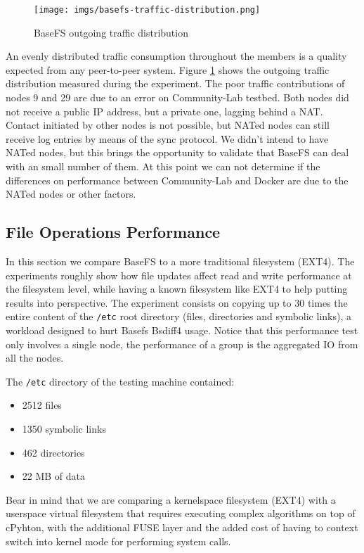 \documentclass{sig-alternate}
\begin{document}
\begin{figure}
\centering
\texttt{[image: imgs/basefs-traffic-distribution.png]}
\caption{BaseFS outgoing traffic distribution}
\label{fig:basefs-traffic-distribution}
\end{figure}


An evenly distributed traffic consumption throughout the members is a quality expected from any peer-to-peer system. Figure \ref{fig:basefs-traffic-distribution} shows the outgoing traffic distribution measured during the experiment. The poor traffic contributions of nodes 9 and 29 are due to an error on Community-Lab testbed. Both nodes did not receive a public IP address, but a private one, lagging behind a NAT. Contact initiated by other nodes is not possible, but NATed nodes can still receive log entries by means of the sync protocol. We didn't intend to have NATed nodes, but this brings the opportunity to validate that BaseFS can deal with an small number of them. At this point we can not determine if the differences on performance between Community-Lab and Docker are due to the NATed nodes or other factors.



\subsection{File Operations Performance}
    
In this section we compare BaseFS to a more traditional filesystem (EXT4). The experiments roughly show how file updates affect read and write performance at the filesystem level, while having a known filesystem like EXT4 to help putting results into perspective. The experiment consists on copying up to 30 times the entire content of the \texttt{/etc} root directory (files, directories and symbolic links), a workload designed to hurt Basefs Bsdiff4 usage. Notice that this performance test only involves a single node, the performance of a group is the aggregated IO from all the nodes.

The \texttt{/etc} directory of the testing machine contained:

\begin{itemize}
 \item 2512 files
 \item 1350 symbolic links
 \item 462 directories
 \item 22 MB of data
\end{itemize}

Bear in mind that we are comparing a kernelspace filesystem (EXT4) with a userspace virtual filesystem that requires executing complex algorithms on top of cPyhton, with the additional FUSE layer and the added cost of having to context switch into kernel mode for performing system calls.
\end{document}

